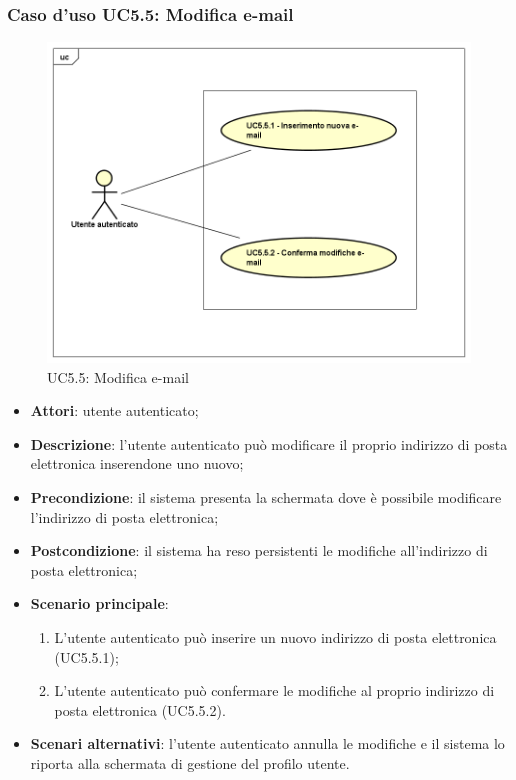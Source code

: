 \subsubsection{Caso d'uso UC5.5: Modifica e-mail}
\label{UC5.5}
\begin{figure}[h]
	\centering
	\includegraphics[scale=0.5,keepaspectratio]{UML/UC5_5.png}
	\caption{UC5.5: Modifica e-mail}
\end{figure}

\begin{itemize}
	\item \textbf{Attori}: utente autenticato;
	\item \textbf{Descrizione}: l'utente autenticato può modificare il proprio indirizzo di posta elettronica inserendone uno nuovo;
	\item \textbf{Precondizione}: il sistema presenta la schermata dove è possibile modificare l'indirizzo di posta elettronica;
	\item \textbf{Postcondizione}: il sistema ha reso persistenti le modifiche all'indirizzo di posta elettronica;
	\item \textbf{Scenario principale}:
		\begin{enumerate}
			\item L'utente autenticato può inserire un nuovo indirizzo di posta elettronica (UC5.5.1);
			\item L'utente autenticato può confermare le modifiche al proprio indirizzo di posta elettronica (UC5.5.2).
		\end{enumerate}
	\item \textbf{Scenari alternativi}: l'utente autenticato annulla le modifiche e il sistema lo riporta alla schermata di gestione del profilo utente.
\end{itemize}

